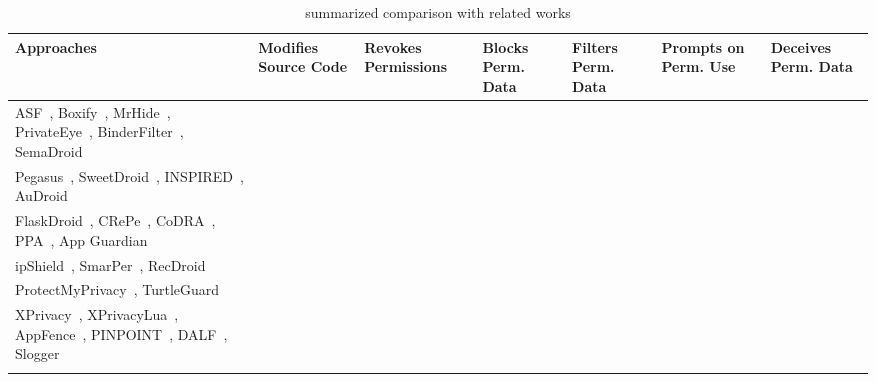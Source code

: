 \begin{table*}[h]
    \caption{\framework{} summarized comparison with related works}
    \begin{center}
    \begin{tabular}{|L{5.7cm}|M{1.6cm}|M{1.5cm}|M{1.4cm}|M{1.4cm}|M{1.5cm}|M{1.4cm}|}
    \hline
    \centering\textbf{Approaches} & \textbf{Modifies Source Code} & \textbf{Revokes Permissions} & \textbf{Blocks Perm. Data} & \textbf{Filters Perm. Data} & \textbf{Prompts on Perm. Use} & \textbf{Deceives Perm. Data}  \\ 
    \hline
    ASF~\cite{backes2014android}, Boxify~\cite{backes2015boxify}, MrHide~\cite{jeon2012dr}, PrivateEye~\cite{raval2016you},  BinderFilter~\cite{wu2017context}, SemaDroid~\cite{xu2015semadroid} &  &  &  &  &  &   \\
    \hline
    Pegasus~\cite{chen2013contextual}, SweetDroid~\cite{chen2017sweetdroid}, INSPIRED~\cite{fu2017inspired}, AuDroid~\cite{petracca2015audroid} &  &  &  &  &  &  \\
    \hline

    FlaskDroid~\cite{bugiel2013flexible}, CRePe~\cite{conti2011crepe}, CoDRA~\cite{thanigaivelan2018codra}, PPA~\cite{liu2016follow}, App Guardian~\cite{zhang2015leave} &  &  &  &  &  &  \\
    \hline
    ipShield~\cite{chakraborty2014ipshield}, SmarPer~\cite{olejnik2017smarper}, RecDroid~\cite{rashidi2016android} &  &  &  &  &  &  \\
    \hline
    ProtectMyPrivacy~\cite{chitkara2017does}, TurtleGuard~\cite{tsai2017turtle} &  &  &  &  &  &  \\
    \hline
    XPrivacy~\cite{bokhorst2017xprivacy}, XPrivacyLua~\cite{bokhorst2021xprivacylua}, AppFence~\cite{hornyack2011these}, PINPOINT~\cite{ratazzi2019pinpoint}, DALF~\cite{raval2019permissions}, Slogger~\cite{shrestha2016slogger} &  &  &  &  &  &  \\
    \hline
    
    \framework{} &  &  &  &  &  &  \\
    \hline
    \end{tabular}
    \label{tab:deceiverRelatedWorkComparison}
    \end{center}
\end{table*}